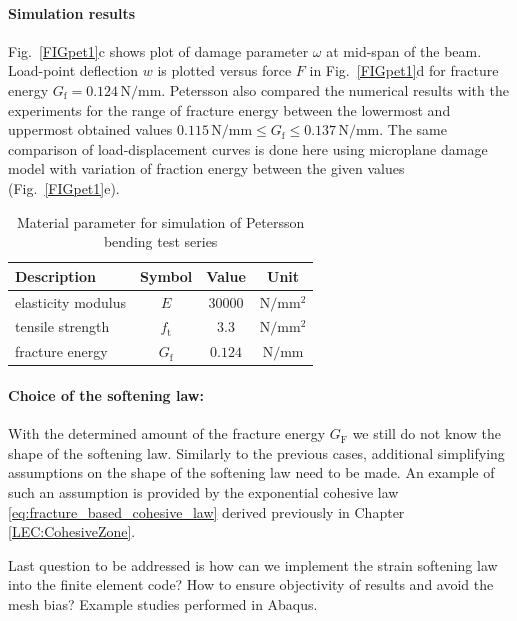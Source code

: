 \documentclass[main.tex]{subfiles}
\begin{document}
\paragraph{Simulation results} Fig.~\ref{FIGpet1}c shows plot of damage parameter $\omega$ at mid-span of the beam. Load-point deflection $w$ is plotted versus force $F$ in Fig.~\ref{FIGpet1}d for fracture energy  $G_\mathrm{f}=0.124\,\mathrm{N/mm}$. Petersson also compared the numerical results with the experiments for the range of fracture energy between the lowermost and uppermost obtained values $0.115\,\mathrm{N/mm} \leq G_\mathrm{f} \leq 0.137\,\mathrm{N/mm}$. The same comparison of load-displacement curves is done here using microplane damage model with variation of fraction energy between the given values (Fig.~\ref{FIGpet1}e).
%
\begin{table}\centering
\caption{Material parameter for simulation of Petersson bending test series}
\begin{tabular}{l ccc}
        \textbf{Description} & \textbf{Symbol} & \textbf{Value} & \textbf{Unit}\\
  \hline
	elasticity modulus & $E$ & $30000$ & $\mathrm{N/mm^2}$ \\
  tensile strength & $f_\mathrm{t}$ & $3.3$ & $\mathrm{N/mm^2}$ \\
  fracture energy & $G_\mathrm{f}$ & $0.124$ & $\mathrm{N/mm}$ \\
\end{tabular}
\label{TABpeterssontestsmat}
\end{table}

\paragraph{Choice of the softening law:}
With the determined amount of the fracture energy $G_\mathrm{F}$ we still do not know the shape of the softening law. 
Similarly to the previous cases, additional simplifying assumptions on the shape of the softening law need to be made.
An example of such an assumption is provided by the exponential cohesive law \ref{eq:fracture_based_cohesive_law} 
derived previously in Chapter \ref{LEC:CohesiveZone}. 

Last question to be addressed is how can we implement the strain softening law into the finite element code? How to ensure objectivity of results and avoid the mesh bias? Example studies performed in Abaqus.
\end{document}
